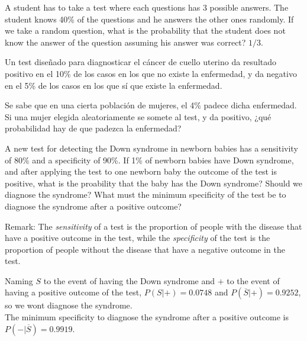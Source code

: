 {A student has to take a test where each questions has 3 possible answers. 
The student knows 40\% of the questions and he answers the other ones randomly. 
If we take a random question, what is the probability that the student does not know the answer of the question assuming his answer was correct?
}
{$1/3$.}
{}


{Un test diseñado para diagnosticar el cáncer de cuello uterino da resultado positivo en el 10\% de los casos en los
que no existe la enfermedad, y da negativo en el 5\% de los casos en los que sí que existe la enfermedad.

Se sabe que en una cierta población de mujeres, el 4\% padece dicha enfermedad.
Si una mujer elegida aleatoriamente se somete al test, y da positivo, ¿qué probabilidad hay de que padezca la
enfermedad?}
{}
{}


{A new test for detecting the Down syndrome in newborn babies has a sensitivity of 80\% and a specificity of 90\%.
If 1\% of newborn babies have Down syndrome, and after applying the test to one newborn baby the outcome of the test is positive, what is the proability that the baby has the Down syndrome? 
Should we diagnose the syndrome?
What must the minimum specificity of the test be to diagnose the syndrome after a positive outcome?

Remark: The \emph{sensitivity} of a test is the proportion of people with the disease that have a positive outcome in the test, while the \emph{specificity} of the test is the proportion of people without the disease that have a negative outcome in the test.}
{Naming $S$ to the event of having the Down syndrome and $+$ to the event of having a positive outcome of the test, $P(S|+)=0.0748$ and $P(\overline{S}|+)=0.9252$, so we wont diagnose the syndrome.\\
The minimum specificity to diagnose the syndrome after a positive outcome is $P(-|\overline{S})=0.9919$.}
{}


